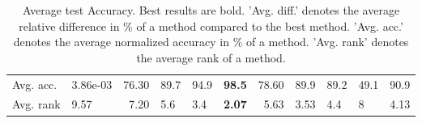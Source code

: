\begin{table}[ht!]
\begin{tabular}{llrlllrllll}
  Avg. acc. & 3.86e-03 & 76.30 & 89.7 & 94.9 & \textbf{98.5} & 78.60 & 89.9 & 89.2 & 49.1 & 90.9 \\ 
  Avg. rank & 9.57 & 7.20 & 5.6 & 3.4 & \textbf{2.07} & 5.63 & 3.53 & 4.4 & 8 & 4.13 \\ 
   \hline
\hline
\end{tabular}
\endgroup
\caption{Average test Accuracy. 
                  Best results are bold. 
                  'Avg. diff.' denotes the average relative difference in \% of a method compared to the best method.
                  'Avg. acc.' denotes the average normalized accuracy in \% of a method.
                  'Avg. rank' denotes the average rank of a method.} 
\label{TABLES/table_results_Accuracy_mahalanobis}
\end{table}
